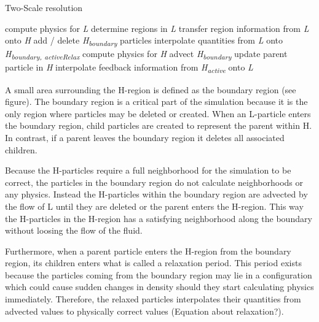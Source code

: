 \documentclass[../../main.tex]{subfiles}
\begin{document}
\begin{algorithm}[h]
    \caption{Two-Scale resolution}
    \label{alg:twoscale}
    \begin{algorithmic}[1]
        \State compute physics for \textit{L}
        \State determine regions in \textit{L}
        \State transfer region information from \textit{L} onto \textit{H}
        \State add / delete \textit{\texorpdfstring{H\textsubscript{boundary}}{H boundary}} particles
        \State interpolate quantities from \textit{L} onto \textit{\texorpdfstring{H\textsubscript{boundary, activeRelax}}{H boundary, activeRelax}}
                \State compute physics for \textit{H}
            \State advect \textit{\texorpdfstring{H\textsubscript{boundary}}{H boundary}}
        \EndFor
        \State update parent particle in \textit{H}
        \State interpolate feedback information from \textit{{\texorpdfstring{H\textsubscript{active}}{H active}}} onto \textit{L}
        \EndWhile
   \end{algorithmic}
\end{algorithm}

A small area surrounding the H-region is defined as the boundary region (see figure). The boundary region is a critical part of the simulation because it is the only region where particles may be deleted or created. When an L-particle enters the boundary region, child particles are created to represent the parent within H. In contrast, if a parent leaves the boundary region it deletes all associated children. 

Because the H-particles require a full neighborhood for the simulation to be correct, the particles in the boundary region do not calculate neighborhoods or any physics. Instead the H-particles within the boundary region are advected by the flow of L until they are deleted or the parent enters the H-region. This way the H-particles in the H-region has a satisfying neighborhood along the boundary without loosing the flow of the fluid. 

Furthermore, when a parent particle enters the H-region from the boundary region, its children enters what is called a relaxation period. This period exists because the particles coming from the boundary region may lie in a configuration which could cause sudden changes in density should they start calculating physics immediately. Therefore, the relaxed particles interpolates their quantities from advected values to physically correct values (Equation about relaxation?). 
\end{document}
